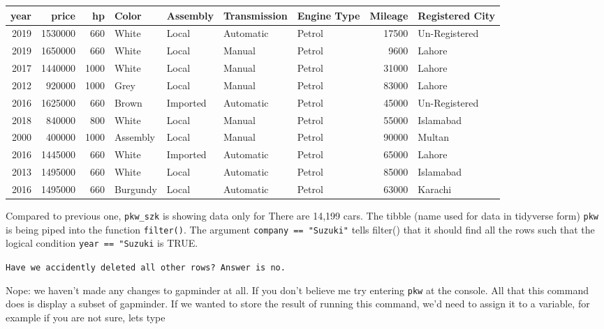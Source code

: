 \documentclass[
  letterpaper,
  DIV=11,
  numbers=noendperiod]{scrartcl}
\begin{document}
\begin{table}
\centering
\begin{tabular}[t]{r|r|r|l|l|l|l|r|l}
\hline
year & price & hp & Color & Assembly & Transmission & Engine Type & Mileage & Registered City\\
\hline
2019 & 1530000 & 660 & White & Local & Automatic & Petrol & 17500 & Un-Registered\\
\hline
2019 & 1650000 & 660 & White & Local & Manual & Petrol & 9600 & Lahore\\
\hline
2017 & 1440000 & 1000 & White & Local & Manual & Petrol & 31000 & Lahore\\
\hline
2012 & 920000 & 1000 & Grey & Local & Manual & Petrol & 83000 & Lahore\\
\hline
2016 & 1625000 & 660 & Brown & Imported & Automatic & Petrol & 45000 & Un-Registered\\
\hline
2018 & 840000 & 800 & White & Local & Manual & Petrol & 55000 & Islamabad\\
\hline
2000 & 400000 & 1000 & Assembly & Local & Manual & Petrol & 90000 & Multan\\
\hline
2016 & 1445000 & 660 & White & Imported & Automatic & Petrol & 65000 & Lahore\\
\hline
2013 & 1495000 & 660 & White & Local & Automatic & Petrol & 85000 & Islamabad\\
\hline
2016 & 1495000 & 660 & Burgundy & Local & Automatic & Petrol & 63000 & Karachi\\
\hline
\end{tabular}
\end{table}

Compared to previous one, \texttt{pkw\_szk} is showing data only for
There are 14,199 cars. The tibble (name used for data in tidyverse form)
\texttt{pkw} is being piped into the function \texttt{filter()}. The
argument \texttt{company\ ==\ "Suzuki"} tells filter() that it should
find all the rows such that the logical condition
\texttt{year\ ==\ "Suzuki} is TRUE.

\texttt{Have\ we\ accidently\ deleted\ all\ other\ rows?\ Answer\ is\ no.}

Nope: we haven't made any changes to gapminder at all. If you don't
believe me try entering \texttt{pkw} at the console. All that this
command does is display a subset of gapminder. If we wanted to store the
result of running this command, we'd need to assign it to a variable,
for example if you are not sure, lets type
\end{document}
